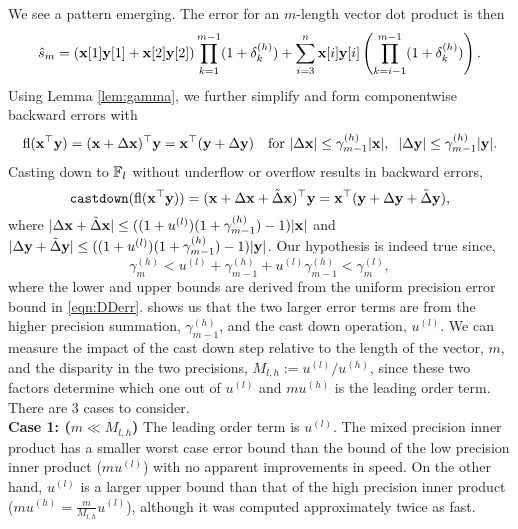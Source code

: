 We see a pattern emerging. 
The error for an $m$-length vector dot product is then
\begin{equation}
\label{eqn:dperr_2}
\hat{s}_m = (\bb{x}[1]\bb{y}[1]+\bb{x}[2]\bb{y}[2])\prod_{k=1}^{m-1}(1+\dd_{k}^{(h)}) + \sum_{i=3}^n \bb{x}[i]\bb{y}[i]\left(\prod_{k=i-1}^{m-1}(1+\dd_{k}^{(h)})\right).
\end{equation}
Using Lemma \ref{lem:gamma}, we further simplify and form componentwise backward errors with
\begin{equation}
\fl(\bb{x}^{\top}\bb{y}) =(\bb{x}+\Delta\bb{x})^{\top}\bb{y} = \bb{x}^{\top}(\bb{y}+\Delta\bb{y})\quad\text{for }|\Delta \bb{x}| \leq \gamma^{(h)}_{m-1}|\bb{x}|,\;\; |\Delta \bb{y}|  \leq \gamma_{m-1}^{(h)}|\bb{y}|. \label{eqn:beforecd}
\end{equation}
Casting down to $\mathbb{F}_l$ without underflow or overflow results in backward errors, 
\begin{equation}
\text{\tt castdown}(\fl(\bb{x}^{\top}\bb{y})) = (\bb{x}+\Delta\bb{x}+\tilde{\Delta}\bb{x})^{\top}\bb{y} = \bb{x}^{\top}(\bb{y}+\Delta\bb{y}+\tilde{\Delta}\bb{y}), \label{eqn:aftercd}
\end{equation}
where $|\Delta\mathbf{x} + \tilde{\Delta} \mathbf{x}| \leq ((1+u^{(l)})(1+\gamma_{m-1}^{(h)})-1)|\mathbf{x}|$ and $|\Delta\mathbf{y}+\tilde{\Delta} \mathbf{y}| \leq ((1+u^{(l)})(1+\gamma_{m-1}^{(h)})-1)|\mathbf{y}|$.
Our hypothesis is indeed true since,
\[\gamma_m^{(h)}<u^{(l)}+\gamma_{m-1}^{(h)}+u^{(l)}\gamma_{m-1}^{(h)}<\gamma_{m}^{(l)},\]
where the lower and upper bounds are derived from the uniform precision error bound in \cref{eqn:DDerr}. 
 shows us that the two larger error terms are from the higher precision summation, $\gamma_{m-1}^{(h)}$, and the cast down operation, $u^{(l)}$.
We can measure the impact of the cast down step relative to the length of the vector, $m$, and the disparity in the two precisions, $M_{l,h}:=u^{(l)}/u^{(h)}$, since these two factors determine which one out of $u^{(l)}$ and $mu^{(h)}$ is the leading order term. 
There are 3 cases to consider. \\
\textbf{Case 1: ($m\ll M_{l,h}$)} The leading order term is $u^{(l)}$.
The mixed precision inner product has a smaller worst case error bound than the bound of the low precision inner product ($mu^{(l)}$) with no apparent improvements in speed.
On the other hand, $u^{(l)}$ is a larger upper bound than that of the high precision inner product ($mu^{(h)}=\frac{m}{M_{l,h}}u^{(l)}$), although it was computed approximately twice as fast. 
